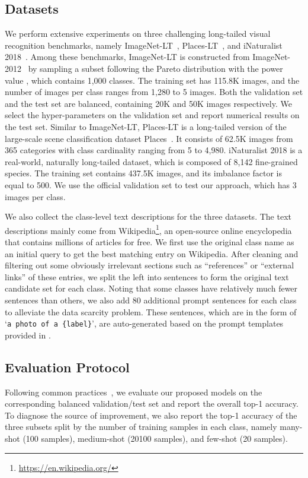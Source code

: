 \documentclass[runningheads]{llncs}
\begin{document}
\subsection{Datasets}
We perform extensive experiments on three challenging long-tailed
visual recognition benchmarks, namely ImageNet-LT~\cite{liu2019large}, Places-LT~\cite{liu2019large}, and iNaturalist 2018~\cite{van2018inaturalist}.
Among these benchmarks, ImageNet-LT is constructed from ImageNet-2012~\cite{deng2009imagenet} by sampling a subset following the Pareto distribution with the power value , which contains 1,000 classes.
The training set has 115.8K images, and the number of images per class ranges from 1,280 to 5 images. Both the validation set and the test set are balanced, containing 20K and 50K images respectively. We select the hyper-parameters on the validation set and report numerical results on the test set.
Similar to ImageNet-LT, Places-LT is a long-tailed version of the large-scale scene classification dataset Places~\cite{zhou2017places}. It consists of 62.5K images from 365 categories with class cardinality ranging from 5 to 4,980.
iNaturalist 2018 is a real-world, naturally long-tailed
dataset, which is composed of 8,142 fine-grained species.
The training set contains 437.5K images, and its imbalance
factor is equal to 500. We use the official validation set to
test our approach, which has 3 images per class.


We also collect the class-level text descriptions for the three datasets.
The text descriptions mainly come from Wikipedia\footnote{\url{https://en.wikipedia.org/}}, an open-source online encyclopedia that contains millions of articles for free. 
We first use the original class name as an initial query to get the best matching entry on Wikipedia.
After cleaning and filtering out some obviously irrelevant sections such as ``references'' or ``external links'' of these entries,
we split the left into sentences to form the original text candidate set for each class. 
Noting that some classes have relatively much fewer sentences than others, we also add 80 additional prompt sentences for each class to alleviate the data scarcity problem.
These sentences, which are in the form of `\texttt{a photo of a \{label\}}', are auto-generated based on the prompt templates provided in \cite{clip}.


\subsection{Evaluation Protocol} 
Following common practices~\cite{liu2019large,zhou2020bbn,cui2021parametric}, we evaluate our proposed models on the corresponding balanced validation/test set and report the overall top-1 accuracy. 
To diagnose the source of improvement, we also report the top-1 accuracy of the three subsets split by the number of training samples in each class, namely many-shot (100 samples), medium-shot (20100 samples), and few-shot (20 samples). 
\end{document}
